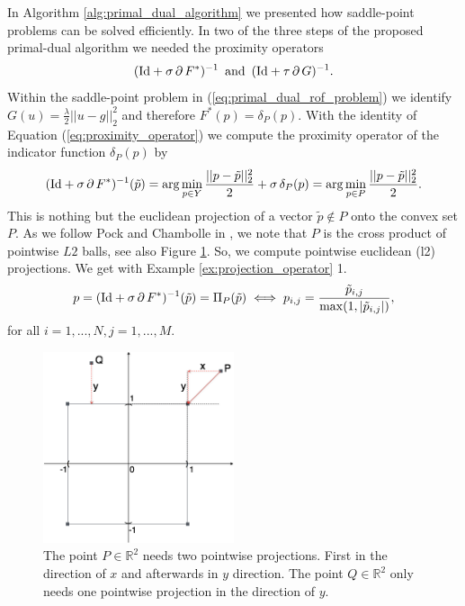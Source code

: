 \documentclass[abstracton]{scrreprt}
\begin{document}
            In Algorithm \ref{alg:primal_dual_algorithm} we presented how saddle-point problems can be solved efficiently. In two of the three steps of the proposed primal-dual algorithm we needed the proximity operators
                $$
                    (\textnormal{Id} + \sigma\,\partial\,F^{\ast})^{-1} \,\,\, \textnormal{and} \,\,\, (\textnormal{Id} + \tau\,\partial\,G)^{-1}.
                $$
            Within the saddle-point problem in (\ref{eq:primal_dual_rof_problem}) we identify $G(u) = \frac{\lambda}{2} ||u - g||_{2}^{2}$ and therefore $F^{\ast}(p) = \delta_{P}(p)$. With the identity of Equation (\ref{eq:proximity_operator}) we compute the proximity operator of the indicator function $\delta_{P}(p)$ by
                $$
                    (\textnormal{Id} + \sigma\,\partial\,F^{\ast})^{-1}(\tilde{p}) = \arg \min_{p \in Y} \frac{||p - \tilde{p}||_{2}^{2}}{2} + \sigma\,\delta_{P}(p) = \arg \min_{p \in P} \frac{||p - \tilde{p}||_{2}^{2}}{2}.
                $$
            This is nothing but the euclidean projection of a vector $\tilde{p} \notin P$ onto the convex set $P$. As we follow Pock and Chambolle in \cite{Chambolle10afirst-order}, we note that $P$ is the cross product of pointwise $L2$ balls, see also Figure \ref{fig:pointwise_l2_projections}. So, we compute pointwise euclidean (l2) projections. We get with Example \ref{ex:projection_operator} 1.
                $$
                    p = (\textnormal{Id} + \sigma\,\partial\,F^{\ast})^{-1}(\tilde{p}) = \Pi_{P}(\tilde{p}) \iff p_{i,j} = \frac{\tilde{p}_{i, j}}{\max(1, |\tilde{p}_{i, j}|)},
                $$
            for all $i = 1, ..., N, j = 1, ..., M$.
            \begin{figure}[!ht]
                \centering
                \includegraphics[width=0.5\textwidth]{img/pointwise_projection.png}
                \caption[Pointwise $l2$ projections.]{The point $P \in \mathbb{R}^{2}$ needs two pointwise projections. First in the direction of $x$ and afterwards in $y$ direction. The point $Q \in \mathbb{R}^{2}$ only needs one pointwise projection in the direction of $y$.}
                \label{fig:pointwise_l2_projections}
            \end{figure}
\end{document}
